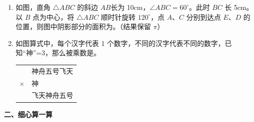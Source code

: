 \documentclass[11pt,a4paper]{ctexart}
\begin{document}
\begin{enumerate}
    \item 
    \begin{minipage}{0.65\textwidth}
        如图，直角 $\triangle ABC$ 的斜边 $AB$长为 10cm，$\angle ABC=60^\circ$。此时 $BC$ 长 5cm。以 $B$ 点为中心，将 $\triangle ABC$ 顺时针旋转 $120^\circ$，点 $A$、$C$ 分别到达点 $E$、$D$ 的位置，则图中阴影部分的面积为\underline{\hspace{2cm}}。（结果保留 $\pi$）
    \end{minipage}
    \hfill
    \begin{minipage}{0.3\textwidth}
    \end{minipage}
    
    \item 如图算式中，每个汉字代表 1 个数字，不同的汉字代表不同的数字，已知“神”=3，那么被乘数是\underline{\hspace{2cm}}。\\
    \begin{center}
    \begin{tabular}{r@{\quad}l}
      & 神舟五号飞天 \\
      $\times$ & \hspace{2.2cm} 神 \\
      \hline
      & 飞天神舟五号
    \end{tabular}
    \end{center}
\end{enumerate}

\vspace{0.8cm}

\noindent \textbf{二、细心算一算}
\end{document}
